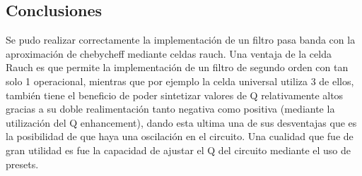 \subsection{Conclusiones}
Se pudo realizar correctamente la implementación de un filtro pasa banda con la aproximación de chebycheff mediante celdas rauch.
Una ventaja de la celda Rauch es que permite la implementación de un filtro de segundo orden con tan solo 1 operacional, mientras que por ejemplo la celda universal utiliza 3 de ellos, también tiene el beneficio de poder sintetizar valores de Q relativamente altos gracias a su doble realimentación tanto negativa como positiva (mediante la utilización del Q enhancement), dando esta ultima una de sus desventajas que es la posibilidad de que haya una oscilación en el circuito.
Una cualidad que fue de gran utilidad es fue la capacidad de ajustar el Q del circuito mediante el uso de presets.

%

